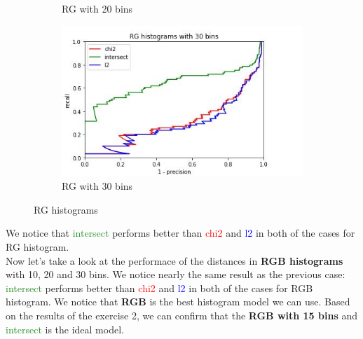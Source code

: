 \documentclass[
	12pt, %
]{fphw}
\begin{document}
\begin{figure}[h!]
\begin{subfigure}[b]{0.3\textwidth}
         \caption{RG with 20 bins}
         \label{fig:three sin x}
     \end{subfigure}
     \hfill
     \begin{subfigure}[b]{0.3\textwidth}
         \centering
         \includegraphics[width=\textwidth]{img/plots/RG_30.JPG}
         \caption{RG with 30 bins}
         \label{fig:five over x}
     \end{subfigure}
        \caption{RG histograms}
        \label{fig:three graphs}
\end{figure}
We notice that \textcolor{ForestGreen}{intersect} performs better than \textcolor{red}{chi2} and \textcolor{blue}{l2} in both of the cases for RG histogram.\\ 
Now let's take a look at the performace of the distances in \textbf{RGB histograms} with 10, 20 and 30 bins. We notice nearly the same result as the previous case: \textcolor{ForestGreen}{intersect} performs better than \textcolor{red}{chi2} and \textcolor{blue}{l2} in both of the cases for RGB histogram. We notice that \textbf{ RGB} is the best histogram model we can use. Based on the results of the exercise 2, we can confirm that the \textbf{RGB with 15 bins} and \textcolor{ForestGreen}{intersect} is the ideal model. 
\end{document}
